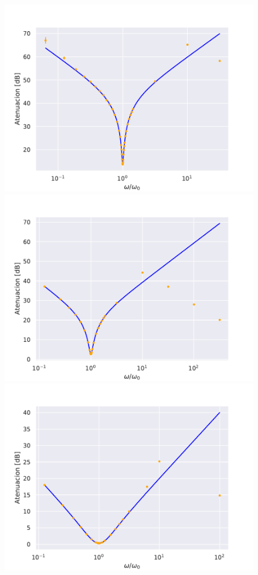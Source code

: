 \begin{figure} [H]
    \centering
    \includegraphics[scale=0.5]{figuras/RLC-SERIE-1/atenuacion.pdf}
    \includegraphics[scale=0.5]{figuras/RLC-SERIE-2/atenuacion.pdf}
    \includegraphics[scale=0.5]{figuras/RLC-SERIE-3/atenuacion.pdf}

\end{figure}
